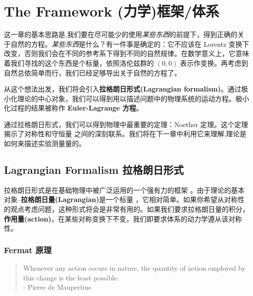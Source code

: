 


\chapter{The Framework (力学)框架/体系}\label{chap4}
这一章的基本思路是,我们要在尽可能少的使用{\it 某些东西}的前提下，得到正确的关于自然的方程。{\it 某些东西}是什么？有一件事是确定的：它不应该在 Lorentz 变换下改变，否则我们会在不同的参考系下得到不同的自然规律。在数学意义上，它意味着我们寻找的这个东西是个标量，依照洛伦兹群的 \( (0,0) \) 表示作变换。再考虑到自然总依简单而行，我们已经足够导出关于自然的方程了。

从这个想法出发，我们将会引入{\bf 拉格朗日形式(Lagrangian formalism)}。通过极小化理论的中心对象，我们可以得到用以描述问题中的物理系统的运动方程。极小化过程的结果被称作 {\bf Euler-Lagrange 方程}。

通过拉格朗日形式，我们可以得到物理中最重要的定理：Noether 定理。这个定理揭示了对称性和守恒量%
%
之间的深刻联系。我们将在下一章中利用它来理解,理论是如何来描述实验测量量的。

\section{Lagrangian Formalism 拉格朗日形式}\label{sec4.1}

拉格朗日形式是在基础物理中被广泛运用的一个强有力的框架%
%
。由于理论的基本对象--{\bf 拉格朗日量(Lagrangian)}是一个标量%
%
，它相对简单。如果你希望从对称性的观点考虑问题，这种形式将会是非常有用的。如果我们要求拉格朗日量的积分，{\bf 作用量(action)}，在某些对称变换下不变，我们即要求体系的动力学遵从该对称性。

\subsection{Fermat 原理}\label{sec4.1.1}
\begin{quote}
Whenever any action occurs in nature, the quantity of action employed by this change is the least possible.\\
- Pierre de Maupertius 
\end{quote}

